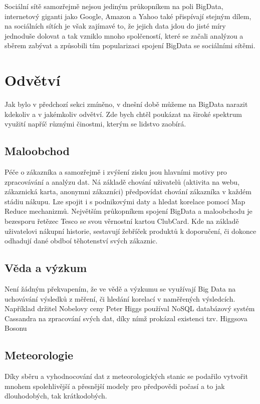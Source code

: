 \documentclass[thesis=M,czech]{FITthesis}[2012/06/26]
\begin{document}
Sociální sítě samozřejmě nejsou jediným průkopníkem na poli BigData, internetový giganti jako Google, Amazon a Yahoo také přispívají stejným dílem, na sociálních sítích je však zajímavé to, že jejich data jdou do jisté míry jednoduše dolovat a tak vzniklo mnoho spolčeností, které se začali analýzou a sběrem zabývat a způsobili tím popularizaci spojení BigData se sociálními sítěmi. 


\section{Odvětví}

Jak bylo v předchozí sekci zmíněno, v dnešní době můžeme na BigData narazit kdekoliv a v jakémkoliv odvětví. Zde bych chtěl poukázat na široké spektrum využití napříč různými činostmi, kterým se lidstvo zaobírá.\cite{sektory}

\subsection{Maloobchod}
Péče o zákazníka a samozřejmě i zvýšení zisku jsou hlavními motivy pro zpracovávání a analýzu dat. Ná základě chování uživatelů (aktivita na webu, zákaznická karta, anonymni zákazníci) předpovídat chování zákazníka v každém stádiu nákupu. Lze spojit i s podnikovými daty a hledat korelace pomocí Map Reduce mechanizmů. Největším průkopníkem spojení BigData a maloobchodu je bezesporu řetězec Tesco se svou věrnostní kartou ClubCard. Kde na základě uživatelovi nákupní historie, sestavují žebříček produktů k doporučení, či dokonce odhadují dané obdboí těhotenství svých zákaznic.\cite{tesco}

\subsection{Věda a výzkum}

Není žádným překvapením, že ve vědě a výzkumu se využívají Big Data na uchovávání výsledků z měření, či hledání korelací v naměřených výsledcích. Například držitel Nobelovy ceny Peter Higgs používal NoSQL databázový systém Cassandra na zpracování svých dat, díky nímž prokázal existenci tzv. Higgsova Bosonu \cite{higgs}

\subsection{Meteorologie}
Díky sběru a vyhodnocování dat z meteorologických stanic se podařilo vytvořit mnohem spolehlivější a přesnější modely pro předpovědi počasí a to jak dlouhodobých, tak krátkodobých. 
\end{document}
